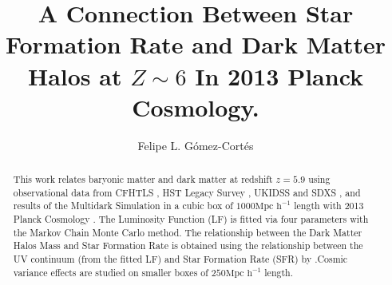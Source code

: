 \documentclass[manuscript]{aastex}
\begin{document}
\title{A Connection Between Star Formation Rate and Dark Matter Halos at 
$Z\sim6$ In 2013 Planck Cosmology.}

\author{Felipe L. G\'omez-Cort\'es }

\begin{abstract}
This work relates baryonic matter and dark matter at redshift $z=5.9$ using 
observational data from CFHTLS \citep{willott13}, HST Legacy Survey
\citep{bouwens14,finkelstein14}, UKIDSS and SDXS \citep{mclure09}, and results of 
the Multidark Simulation \citep{klypin14} in a cubic box of $1000 \textrm{Mpc 
h}^{-1}$ length with 2013 Planck Cosmology \citep{planck1}. The Luminosity Function (LF) is 
fitted via four parameters with the Markov Chain Monte Carlo method. The 
relationship between the Dark Matter Halos Mass and Star Formation Rate is 
obtained using the relationship between the UV  continuum (from the fitted LF) 
and Star Formation Rate (SFR) by \cite{kennicutt98}.Cosmic variance effects are 
studied on smaller boxes of $250 \textrm{Mpc h}^{-1}$ length.

\end{abstract}

%



%


\acknowledgments
\appendix

\end{document}
